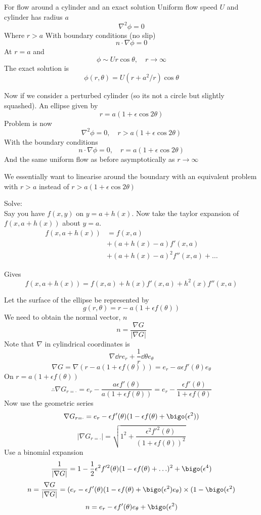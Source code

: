 \documentclass{X:/Documents/Coding/Latex/myassignment}
\begin{document}
For flow around a cylinder and an exact solution
Uniform flow speed $U$ and cylinder has radius $a$
\[\nabla^2 \phi = 0\]
Where $r>a$
With boundary conditions (no slip)
\[n \cdot \nabla \phi = 0\]
At $r=a$ and
\[\phi \sim Ur\cos\theta, \quad r\to\infty\]
The exact solution is
\[\phi(r,\theta) = U (r + a^2/r) \cos\theta\]

Now if we consider a perturbed cylinder (so its not a circle but slightly squashed).
An ellipse given by
\[r = a(1+\epsilon\cos2\theta)\]
Problem is now
\[\nabla^2 \phi = 0 ,\quad r > a(1+\epsilon\cos2\theta)\]
With the boundary conditions
\[n\cdot \nabla\phi = 0, \quad r=a(1+\epsilon\cos2\theta)\]
And the same uniform flow as before asymptotically as $r\to\infty$

We essentially want to linearise around the boundary with an equivalent problem with $r>a$ instead of $r>a(1+\epsilon\cos2\theta)$

Solve:\\
Say you have $f(x,y)$ on $y=a + h(x)$. Now take the taylor expansion of $f(x,a+h(x))$ about $y=a$.
\begin{align*}
f(x,a+h(x)) &= f(x,a)\\
&+(a+h(x)-a) f'(x,a)\\
&+(a+h(x)-a)^2 f''(x,a) + \hdots
\end{align*}

Gives
\[f(x,a+h(x)) = f(x,a) + h(x)f'(x,a) + h^2(x) f''(x,a)\]

Let the surface of the ellipse be represented by
\[g(r,\theta) = r - a(1+\epsilon f(\theta))\]
We need to obtain the normal vector, $n$
\[n = \frac{\nabla G}{|\nabla G|} \]
Note that $\nabla$ in cylindrical coordinates is
\[\nabla \dd{}r e_r + \frac1r \dd{}\theta e_\theta\]
\[\nabla G = \nabla(r - a(1+\epsilon f(\theta))) = e_r - a\epsilon f'(\theta) e_\theta\]
On $r = a(1+\epsilon f(\theta))$
\[\therefore \nabla G_{r=\cdot} = e_r - \frac{a \epsilon f'(\theta)}{a(1+\epsilon f(\theta))} = e_r - \frac{\epsilon f'(\theta)}{1+\epsilon f(\theta)}\]
Now use the geometric series
\[\nabla G_{r=\cdot} = e_r - \epsilon f'(\theta) (1-\epsilon f(\theta) + \bigo(\epsilon^2))\]
\[|\nabla G_{r=\cdot}| = \sqrt{1^2 + \frac{\epsilon^2 f'^2(\theta)}{(1+\epsilon f(\theta))^2}}\]
Use a binomial expansion
\[\frac1{|\nabla G|} = 1 - \frac12 \epsilon^2 f'^2(\theta)(1-\epsilon f(\theta) + \hdots)^2 + \bigo(\epsilon^4)\]
\[n = \frac{\nabla G}{|\nabla G|} = (e_r - \epsilon f'(\theta) (1-\epsilon f(\theta) + \bigo(\epsilon^2) e_\theta) \times (1- \bigo(\epsilon^2)\]
\[n = e_r - \epsilon f'(\theta)e_\theta + \bigo(\epsilon^2)\]
\end{document}
